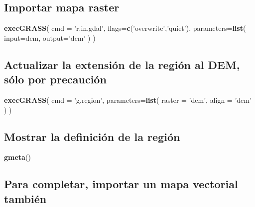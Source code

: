\documentclass[11pt,]{article}
\newenvironment{Shaded}{\begin{snugshade}}{\end{snugshade}}
\newcommand{\KeywordTok}[1]{\textcolor[rgb]{0.13,0.29,0.53}{\textbf{#1}}}
\newcommand{\DataTypeTok}[1]{\textcolor[rgb]{0.13,0.29,0.53}{#1}}
\newcommand{\StringTok}[1]{\textcolor[rgb]{0.31,0.60,0.02}{#1}}
\newcommand{\NormalTok}[1]{#1}
\begin{document}
\subsection{Importar mapa raster}\label{importar-mapa-raster}

\begin{Shaded}
\begin{Highlighting}[]
\KeywordTok{execGRASS}\NormalTok{(}
  \DataTypeTok{cmd =} \StringTok{'r.in.gdal'}\NormalTok{,}
  \DataTypeTok{flags=}\KeywordTok{c}\NormalTok{(}\StringTok{'overwrite'}\NormalTok{,}\StringTok{'quiet'}\NormalTok{),}
  \DataTypeTok{parameters=}\KeywordTok{list}\NormalTok{(}
    \DataTypeTok{input=}\NormalTok{dem,}
    \DataTypeTok{output=}\StringTok{'dem'}
\NormalTok{  )}
\NormalTok{)}
\end{Highlighting}
\end{Shaded}

\subsection{Actualizar la extensión de la región al DEM, sólo por
precaución}\label{actualizar-la-extensiuxf3n-de-la-regiuxf3n-al-dem-suxf3lo-por-precauciuxf3n}

\begin{Shaded}
\begin{Highlighting}[]
\KeywordTok{execGRASS}\NormalTok{(}
  \DataTypeTok{cmd =} \StringTok{'g.region'}\NormalTok{,}
  \DataTypeTok{parameters=}\KeywordTok{list}\NormalTok{(}
    \DataTypeTok{raster =} \StringTok{'dem'}\NormalTok{,}
    \DataTypeTok{align =} \StringTok{'dem'}
\NormalTok{  )}
\NormalTok{)}
\end{Highlighting}
\end{Shaded}

\subsection{Mostrar la definición de la
región}\label{mostrar-la-definiciuxf3n-de-la-regiuxf3n}

\begin{Shaded}
\begin{Highlighting}[]
\KeywordTok{gmeta}\NormalTok{()}
\end{Highlighting}
\end{Shaded}

\subsection{Para completar, importar un mapa vectorial
también}\label{para-completar-importar-un-mapa-vectorial-tambiuxe9n}
\end{document}
